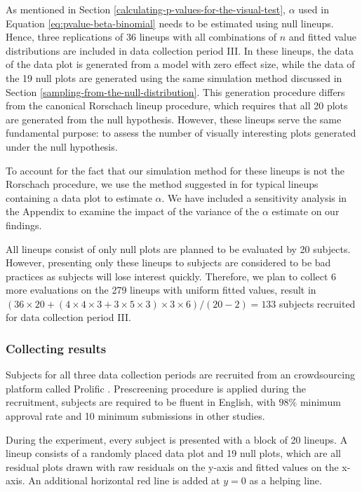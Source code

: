 \documentclass[]{interact}
\theoremstyle{plain}%
\theoremstyle{definition}
\theoremstyle{remark}
\begin{document}
As mentioned in Section \ref{calculating-p-values-for-the-visual-test},
\(\alpha\) used in Equation \ref{eq:pvalue-beta-binomial} needs to be
estimated using null lineups. Hence, three replications of 36 lineups
with all combinations of \(n\) and fitted value distributions are
included in data collection period III. In these lineups, the data of
the data plot is generated from a model with zero effect size, while the
data of the 19 null plots are generated using the same simulation method
discussed in Section \ref{sampling-from-the-null-distribution}. This
generation procedure differs from the canonical Rorschach lineup
procedure, which requires that all 20 plots are generated from the null
hypothesis. However, these lineups serve the same fundamental purpose:
to assess the number of visually interesting plots generated under the
null hypothesis.

To account for the fact that our simulation method for these lineups is
not the Rorschach procedure, we use the method suggested in
\citet{vanderplas2021statistical} for typical lineups containing a data
plot to estimate \(\alpha\). We have included a sensitivity analysis in
the Appendix to examine the impact of the variance of the \(\alpha\)
estimate on our findings.

All lineups consist of only null plots are planned to be evaluated by 20
subjects. However, presenting only these lineups to subjects are
considered to be bad practices as subjects will lose interest quickly.
Therefore, we plan to collect 6 more evaluations on the 279 lineups with
uniform fitted values, result in
\((36 \times 20 + (4 \times 4 \times 3 + 3 \times 5 \times 3) \times 3 \times 6) / (20-2) = 133\)
subjects recruited for data collection period III.

\hypertarget{collecting-results}{%
\subsubsection{Collecting results}\label{collecting-results}}

Subjects for all three data collection periods are recruited from an
crowdsourcing platform called Prolific \citep{palan2018prolific}.
Prescreening procedure is applied during the recruitment, subjects are
required to be fluent in English, with \(98\%\) minimum approval rate
and 10 minimum submissions in other studies.

During the experiment, every subject is presented with a block of 20
lineups. A lineup consists of a randomly placed data plot and 19 null
plots, which are all residual plots drawn with raw residuals on the
y-axis and fitted values on the x-axis. An additional horizontal red
line is added at \(y = 0\) as a helping line.
\end{document}
